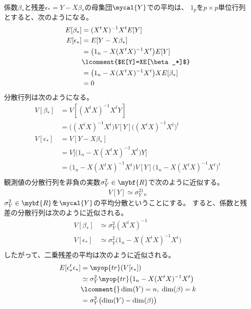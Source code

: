 	係数$\beta_*$と残差$\epsilon_*=Y-X\beta_*$の母集団$\mycal{Y}$での平均は、
	$1_p$を$p\times p$単位行列とすると、次のようになる。
	\begin{equation*}\begin{split} %
		E[\beta_*] &= (X^tX)^{-1}X^tE[Y] \\
		E[\epsilon_*] &= E[Y-X\beta_*] \\
			&= \bigl(1_n - X(X^tX)^{-1}X^t\bigr)E[Y] \\
			&\lcomment{$E[Y]=XE[\beta_*]$} \\
			&= \bigl(1_n - X(X^tX)^{-1}X^t\bigr)XE[\beta_*] \\
			&= 0
	\end{split}\end{equation*} %
	分散行列は次のようになる。
	\begin{equation*}\begin{split} %
		V[\beta_*] &= V[(X^tX)^{-1}X^tY] \\
			&= \bigl((X^tX)^{-1}X^t\bigr)V[Y]\bigl((X^tX)^{-1}X^t\bigr)^t \\
		V[\epsilon_*] &= V[Y-X\beta_*] \\
			&= V\bigl[\bigl(1_n - X(X^tX)^{-1}X^t\bigr)Y\bigr] \\
			&= \bigl(1_n - X(X^tX)^{-1}X^t\bigr)
				V[Y]\bigl(1_n - X(X^tX)^{-1}X^t\bigr)^t \\
	\end{split}\end{equation*} %
	観測値の分散行列を非負の実数$\sigma_Y^2\in\mybf{R}$で次のように近似する。
	\begin{equation*}\begin{split} %
		V[Y] \simeq \sigma_Y^21_n
	\end{split}\end{equation*} %
	$\sigma_Y^2\in\mybf{R}$を$\mycal{Y}$の平均分散ということにする。
	すると、係数と残差の分散行列は次のように近似される。
	\begin{equation*}\begin{split} %
		V[\beta_*] &\simeq \sigma_Y^2(X^tX)^{-1} \\
		V[\epsilon_*] &\simeq \sigma_Y^2\bigl(1_n - X(X^tX)^{-1}X^t\bigr) \\
	\end{split}\end{equation*} %
	したがって、二乗残差の平均は次のように近似される。
	\begin{equation*}\begin{split} %
		E[\epsilon_*^t\epsilon_*] &= \myop{tr}(V[\epsilon_*]) \\
		&\simeq \sigma_Y^2\myop{tr}\bigl(1_n - X(X^tX)^{-1}X^t\bigr) \\
		&\lcomment{}\dim(Y)=n,\;\dim(\beta)=k \\
		&= \sigma_Y^2\bigl(\dim(Y)-\dim(\beta)\bigr) \\
	\end{split}\end{equation*} %
